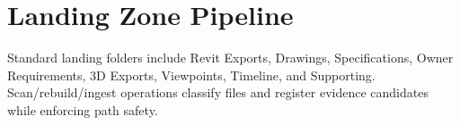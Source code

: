 \section{Landing Zone Pipeline}
Standard landing folders include Revit Exports, Drawings, Specifications, Owner Requirements, 3D Exports, Viewpoints, Timeline, and Supporting. Scan/rebuild/ingest operations classify files and register evidence candidates while enforcing path safety.

